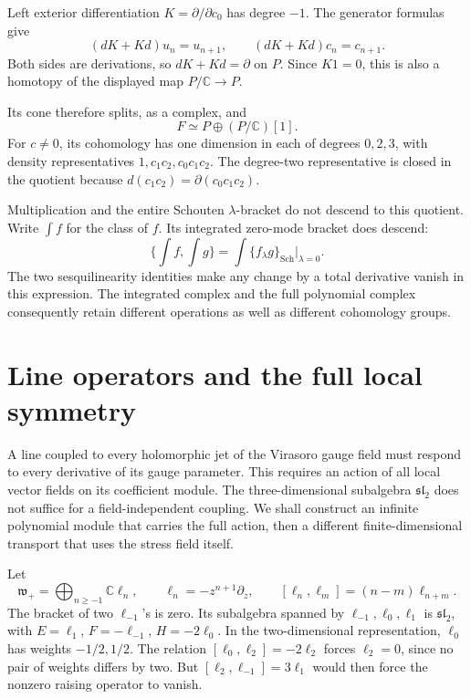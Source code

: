 Left\label{pcsm:def:virasoro-translation-homotopy} exterior differentiation \(K=\partial/\partial c_0\) has
degree \(-1\). The generator formulas give
\[
 (dK+Kd)u_n=u_{n+1},\qquad
 (dK+Kd)c_n=c_{n+1}.
\]
Both sides are derivations, so \(dK+Kd=\partial\) on \(P\).
Since \(K1=0\), this is also a homotopy of the displayed map
\(P/\mathbb C\to P\).

Its cone therefore splits, as a complex, and
\[
 F\simeq P\oplus(P/\mathbb C)[1].
\]
For \(c\ne0\), its cohomology has one dimension in each of
degrees \(0,2,3\), with density representatives
\(1,c_1c_2,c_0c_1c_2\).
The degree-two representative is closed in the quotient because
\(d(c_1c_2)=\partial(c_0c_1c_2)\).

Multiplication and the entire Schouten \(\lambda\)-bracket do not
descend to this quotient. Write \(\int f\) for the class of \(f\).
Its integrated zero-mode bracket does descend:
\[
 \{\!\int f,\int g\!\}
       =\int\{f_\lambda g\}_{\mathrm{Sch}}\big|_{\lambda=0}.
\]
The two sesquilinearity identities make any change by a total
derivative vanish in this expression.
The integrated complex and the full polynomial complex consequently
retain different operations as well as different cohomology groups.

\section{Line operators and the full local symmetry}
\label{pcsm:sec:witt-lines}

A line coupled to every holomorphic jet of the Virasoro gauge field
must respond to every derivative of its gauge parameter.
This requires an action of all local vector fields on its coefficient
module. The three-dimensional subalgebra \(\mathfrak{sl}_2\)
does not suffice for a field-independent coupling.
We shall construct an infinite polynomial module that carries the
full action, then a different finite-dimensional transport that uses
the stress field itself.

Let\label{pcsm:def:witt-algebra}
\[
 \mathfrak w_+=\bigoplus_{n\geq-1}\mathbb C\ell_n,
 \qquad \ell_n=-z^{n+1}\partial_z,
 \qquad [\ell_n,\ell_m]=(n-m)\ell_{n+m}.
\]
The bracket of two \(\ell_{-1}\)'s is zero.
Its subalgebra spanned by \(\ell_{-1},\ell_0,\ell_1\) is
\(\mathfrak{sl}_2\), with
\(E=\ell_1\), \(F=-\ell_{-1}\), \(H=-2\ell_0\).
In the two-dimensional representation, \(\ell_0\) has weights
\(-1/2,1/2\). The relation
\([\ell_0,\ell_2]=-2\ell_2\) forces \(\ell_2=0\), since
no pair of weights differs by two.
But \([\ell_2,\ell_{-1}]=3\ell_1\) would then force the
nonzero raising operator to vanish.

